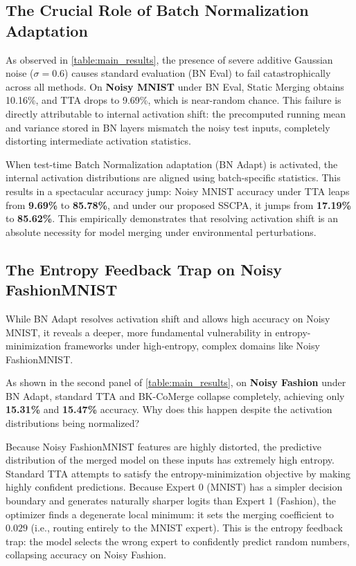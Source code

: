 \documentclass{article}
\theoremstyle{plain}
\theoremstyle{definition}
\theoremstyle{remark}
\begin{document}
\subsection{The Crucial Role of Batch Normalization Adaptation}
As observed in \cref{table:main_results}, the presence of severe additive Gaussian noise ($\sigma = 0.6$) causes standard evaluation (BN Eval) to fail catastrophically across all methods. On \textbf{Noisy MNIST} under BN Eval, Static Merging obtains 10.16\%, and TTA drops to 9.69\%, which is near-random chance. This failure is directly attributable to internal activation shift: the precomputed running mean and variance stored in BN layers mismatch the noisy test inputs, completely distorting intermediate activation statistics.

When test-time Batch Normalization adaptation (BN Adapt) is activated, the internal activation distributions are aligned using batch-specific statistics. This results in a spectacular accuracy jump: Noisy MNIST accuracy under TTA leaps from \textbf{9.69\%} to \textbf{85.78\%}, and under our proposed SSCPA, it jumps from \textbf{17.19\%} to \textbf{85.62\%}. This empirically demonstrates that resolving activation shift is an absolute necessity for model merging under environmental perturbations.

\subsection{The Entropy Feedback Trap on Noisy FashionMNIST}
While BN Adapt resolves activation shift and allows high accuracy on Noisy MNIST, it reveals a deeper, more fundamental vulnerability in entropy-minimization frameworks under high-entropy, complex domains like Noisy FashionMNIST.

As shown in the second panel of \cref{table:main_results}, on \textbf{Noisy Fashion} under BN Adapt, standard TTA and BK-CoMerge collapse completely, achieving only \textbf{15.31\%} and \textbf{15.47\%} accuracy. Why does this happen despite the activation distributions being normalized? 

Because Noisy FashionMNIST features are highly distorted, the predictive distribution of the merged model on these inputs has extremely high entropy. Standard TTA attempts to satisfy the entropy-minimization objective by making highly confident predictions. Because Expert 0 (MNIST) has a simpler decision boundary and generates naturally sharper logits than Expert 1 (Fashion), the optimizer finds a degenerate local minimum: it sets the merging coefficient to $0.029$ (i.e., routing entirely to the MNIST expert). This is the entropy feedback trap: the model selects the wrong expert to confidently predict random numbers, collapsing accuracy on Noisy Fashion.
\end{document}
